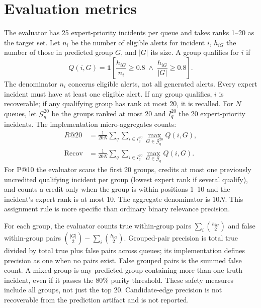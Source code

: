 \section{Evaluation metrics}
The evaluator has 25 expert-priority incidents per queue and takes ranks 1--20 as the target set. Let $n_i$ be the number of eligible alerts for incident $i$, $h_{iG}$ the number of those in predicted group $G$, and $|G|$ its size. A group qualifies for $i$ if
\begin{equation}\label{eq:qualify}Q(i,G)=\mathbf{1}\left[\frac{h_{iG}}{n_i}\geq0.8\;\land\;\frac{h_{iG}}{|G|}\geq0.8\right].\end{equation}
The denominator $n_i$ concerns eligible alerts, not all generated alerts. Every expert incident must have at least one eligible alert. If any group qualifies, $i$ is recoverable; if any qualifying group has rank at most 20, it is recalled. For $N$ queues, let $\mathcal G_q^{20}$ be the groups ranked at most 20 and $I_q^{20}$ the 20 expert-priority incidents. The implementation micro-aggregates counts:
\begin{align}\label{eq:recall}
R@20&=\frac{1}{20N}\sum_q\sum_{i\in I_q^{20}}
\max_{G\in\mathcal G_q^{20}} Q(i,G),\\
\operatorname{Recov}&=\frac{1}{20N}\sum_q\sum_{i\in I_q^{20}}
\max_{G\in\mathcal G_q} Q(i,G).
\end{align}
For P@10 the evaluator scans the first 20 groups, credits at most one previously uncredited qualifying incident per group (lowest expert rank if several qualify), and counts a credit only when the group is within positions 1--10 and the incident's expert rank is at most 10. The aggregate denominator is $10N$. This assignment rule is more specific than ordinary binary relevance precision.

For each group, the evaluator counts true within-group pairs $\sum_i\binom{h_{iG}}2$ and false within-group pairs $\binom{|G|}2-\sum_i\binom{h_{iG}}2$. Grouped-pair precision is total true divided by total true plus false pairs across queues; its implementation defines precision as one when no pairs exist. False grouped pairs is the summed false count. A mixed group is any predicted group containing more than one truth incident, even if it passes the 80\% purity threshold. These safety measures include all groups, not just the top 20. Candidate-edge precision is not recoverable from the prediction artifact and is not reported.
